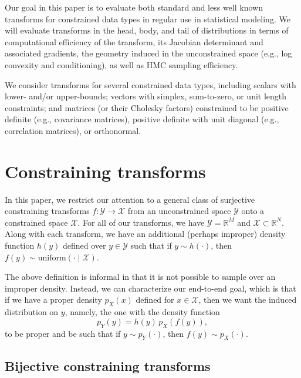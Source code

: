 \documentclass[11pt]{article}
\begin{document}
Our goal in this paper is to evaluate both standard and less well known transforms for constrained data types in regular use in statistical modeling.  We will evaluate transforms in the head, body, and tail of distributions in terms of computational efficiency of the transform, its Jacobian determinant and associated gradients, the geometry induced in the unconstrained space (e.g., log convexity and conditioning), as well as HMC sampling efficiency. 

We consider transforms for several constrained data types, including scalars with lower- and/or upper-bounds; vectors with simplex, sum-to-zero, or unit length constraints; and matrices (or their Cholesky factors) constrained to be positive definite (e.g., covariance matrices), positive definite with unit diagonal (e.g., correlation matrices), or orthonormal.  

\section{Constraining transforms}

In this paper, we restrict our attention to a general class of surjective constraining transforms $f : \mathcal{Y} \rightarrow \mathcal{X}$ from an unconstrained space $\mathcal{Y}$ onto a constrained space $\mathcal{X}$.  For all of our transforms, we have $\mathcal{Y} = \mathbb{R}^M$ and $\mathcal{X} \subset \mathbb{R}^N$.  Along with each transform, we have an additional (perhaps improper) density function $h(y)$ defined over $y \in \mathcal{Y}$ such that if $y \sim h(\cdot)$, then $f(y) \sim \textrm{uniform}(\cdot \mid \mathcal{X})$.  

The above definition is informal in that it is not possible to sample over an improper density.  Instead, we can characterize our end-to-end goal, which is that if we have a proper density $p_X(x)$ defined for $x \in \mathcal{X}$, then we want the induced distribution on $y$, namely, the one with the density function
$$
p_Y(y) = h(y) \, p_X(f(y)),
$$
to be proper and be such that if $y \sim p_Y(\cdot)$, then $f(y) \sim p_X(\cdot)$.

\subsection{Bijective constraining transforms}
\end{document}
